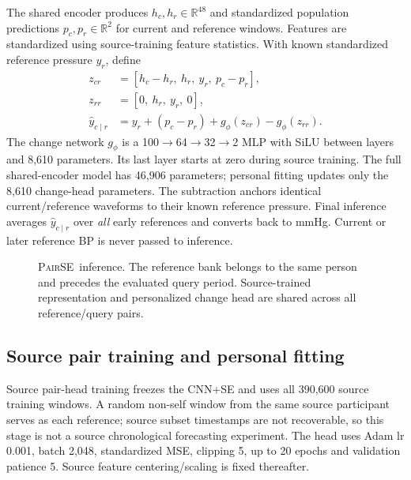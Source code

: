 \documentclass[conference]{IEEEtran}
\newcommand{\pair}{\textsc{PairSE}}
\begin{document}
The shared encoder produces $h_c,h_r\in\mathbb R^{48}$ and standardized
population predictions $p_c,p_r\in\mathbb R^2$ for current and reference
windows. Features are standardized using source-training feature statistics.
With known standardized reference pressure $y_r$, define
\begin{align}
 z_{cr}&=[h_c-h_r,\ h_r,\ y_r,\ p_c-p_r],\\
 z_{rr}&=[0,\ h_r,\ y_r,\ 0],\\
 \widehat y_{c\mid r}&=y_r+(p_c-p_r)+g_\phi(z_{cr})-g_\phi(z_{rr}).
\end{align}
The change network $g_\phi$ is a 100$\to$64$\to$32$\to$2 MLP with SiLU between
layers and 8,610 parameters. Its last layer starts at zero during source
training. The full shared-encoder model has 46,906 parameters; personal fitting
updates only the 8,610 change-head parameters. The subtraction anchors identical
current/reference waveforms to their known reference pressure. Final inference
averages $\widehat y_{c\mid r}$ over \emph{all} early references and converts
back to mmHg. Current or later reference BP is never passed to inference.

\begin{figure}[t]\centering
{}
\caption{\pair\ inference. The reference bank belongs to the same person and
precedes the evaluated query period. Source-trained representation and
personalized change head are shared across all reference/query pairs.}
\label{fig:pair}
\end{figure}

\subsection{Source pair training and personal fitting}
Source pair-head training freezes the CNN+SE and uses all 390,600 source
training windows. A random non-self window from the same source participant
serves as each reference; source subset timestamps are not recoverable, so
this stage is not a source chronological forecasting experiment. The head uses
Adam lr 0.001, batch 2,048, standardized MSE, clipping 5, up to 20 epochs and
validation patience 5. Source feature centering/scaling is fixed thereafter.
\end{document}

